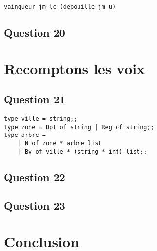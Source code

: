 \documentclass[french, 10pt, a4paper]{article}
\begin{document}
\begin{verbatim}
vainqueur_jm lc (depouille_jm u)
\end{verbatim}



\subsection{Question 20}




\section{Recomptons les voix}

\subsection{Question 21}

\begin{verbatim}
type ville = string;;
type zone = Dpt of string | Reg of string;;
type arbre =
	| N of zone * arbre list
	| Bv of ville * (string * int) list;;
\end{verbatim}



\subsection{Question 22}




\subsection{Question 23}




\section{Conclusion}
\end{document}
